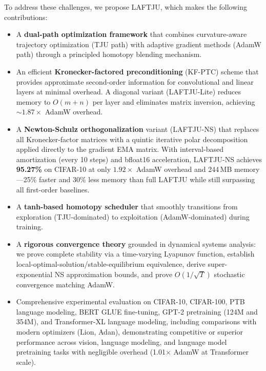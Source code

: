 \documentclass[10pt,twocolumn]{article}
\newcommand{\method}{LAFTJU}
\begin{document}
To address these challenges, we propose \method{}, which makes the following contributions:
\begin{itemize}
    \item A \textbf{dual-path optimization framework} that combines curvature-aware trajectory optimization (TJU path) with adaptive gradient methods (AdamW path) through a principled homotopy blending mechanism.
    \item An efficient \textbf{Kronecker-factored preconditioning} (KF-PTC) scheme that provides approximate second-order information for convolutional and linear layers at minimal overhead. A diagonal variant (\method{}-Lite) reduces memory to $O(m+n)$ per layer and eliminates matrix inversion, achieving $\sim\!1.87\times$ AdamW overhead.
    \item A \textbf{Newton-Schulz orthogonalization} variant (\method{}-NS) that replaces all Kronecker-factor matrices with a quintic iterative polar decomposition applied directly to the gradient EMA matrix. With interval-based amortization (every 10 steps) and bfloat16 acceleration, \method{}-NS achieves \textbf{95.27\%} on CIFAR-10 at only $1.92\times$ AdamW overhead and 244\,MB memory---25\% faster and 30\% less memory than full \method{} while still surpassing all first-order baselines.
    \item A \textbf{tanh-based homotopy scheduler} that smoothly transitions from exploration (TJU-dominated) to exploitation (AdamW-dominated) during training.
    \item A \textbf{rigorous convergence theory} grounded in dynamical systems analysis: we prove complete stability via a time-varying Lyapunov function, establish local-optimal-solution/stable-equilibrium equivalence, derive super-exponential NS approximation bounds, and prove $O(1/\sqrt{T})$ stochastic convergence matching AdamW.
    \item Comprehensive experimental evaluation on CIFAR-10, CIFAR-100, PTB language modeling, BERT GLUE fine-tuning, GPT-2 pretraining (124M and 354M), and Transformer-XL language modeling, including comparisons with modern optimizers (Lion, Adan), demonstrating competitive or superior performance across vision, language modeling, and language model pretraining tasks with negligible overhead (1.01$\times$ AdamW at Transformer scale).
\end{itemize}

\end{document}
